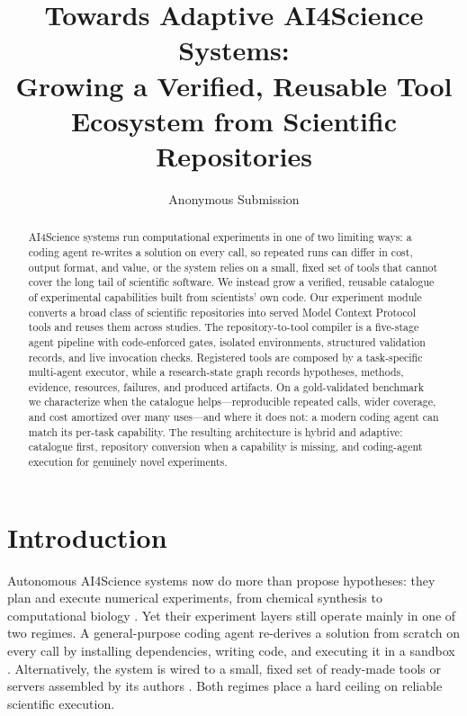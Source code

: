 \documentclass[letterpaper]{article} %
\title{Towards Adaptive AI4Science Systems:\\
Growing a Verified, Reusable Tool Ecosystem from Scientific Repositories}
\author{Anonymous Submission}
\begin{document}
\maketitle

\begin{abstract}
AI4Science systems run computational experiments in one of two limiting ways: a coding agent re-writes a solution on every call, so repeated runs can differ in cost, output format, and value, or the system relies on a small, fixed set of tools that cannot cover the long tail of scientific software. We instead grow a verified, reusable catalogue of experimental capabilities built from scientists' own code. Our experiment module converts a broad class of scientific repositories into served Model Context Protocol tools and reuses them across studies. The repository-to-tool compiler is a five-stage agent pipeline with code-enforced gates, isolated environments, structured validation records, and live invocation checks. Registered tools are composed by a task-specific multi-agent executor, while a research-state graph records hypotheses, methods, evidence, resources, failures, and produced artifacts. On a gold-validated benchmark we characterize when the catalogue helps---reproducible repeated calls, wider coverage, and cost amortized over many uses---and where it does not: a modern coding agent can match its per-task capability. The resulting architecture is hybrid and adaptive: catalogue first, repository conversion when a capability is missing, and coding-agent execution for genuinely novel experiments.
\end{abstract}

\section{Introduction}

Autonomous AI4Science systems now do more than propose hypotheses: they plan and execute numerical experiments, from chemical synthesis to computational biology \citep{boiko2023autonomous,bran2024chemcrow,lu2024aiscientist,google2025coscientist,swanson2025virtuallab}. Yet their experiment layers still operate mainly in one of two regimes. A general-purpose coding agent re-derives a solution from scratch on every call by installing dependencies, writing code, and executing it in a sandbox \citep{lu2024aiscientist,schmidgall2025agentlab}. Alternatively, the system is wired to a small, fixed set of ready-made tools or servers assembled by its authors \citep{boiko2023autonomous,bran2024chemcrow}. Both regimes place a hard ceiling on reliable scientific execution.
\end{document}

